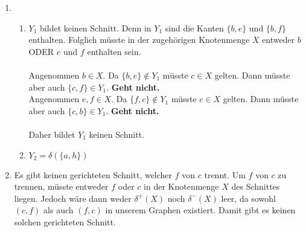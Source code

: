 \documentclass[12pt, a4paper]{article}
\begin{document}
\begin{enumerate}[label=\alph*)]
	\item
		\begin{enumerate}[label=(\roman*)]
			\item $Y_1$ bildet keinen Schnitt. Denn in $Y_1$ sind die Kanten $\{b,e\}$ und $\{b,f\}$ enthalten. Folglich müsste in der zugehörigen Knotenmenge $X$ entweder $b$ ODER $e$ und $f$ enthalten sein.\\
				\\Angenommen $b \in X$. Da $\{b,e\} \not\in Y_1$ müsste $c \in X$ gelten. Dann müsste aber auch $\{c,f\} \in Y_1$. \textbf{Geht nicht.}\\
				Angenommen $e,f \in X$. Da $\{f,c\} \not\in Y_1$ müsste $c \in X$ gelten. Dann müsste aber auch $\{c,b\} \in Y_1$. \textbf{Geht nicht.}\\
				\\Daher bildet $Y_1$ keinen Schnitt.
			
			\item $Y_2 = \delta(\{a,h\})$
		\end{enumerate}
	
	\item Es gibt keinen gerichteten Schnitt, welcher $f$ von $c$ trennt. Um $f$ von $c$ zu trennen, müsste entweder $f$ oder $c$ in der Knotenmenge $X$ des Schnittes liegen. Jedoch wäre dann weder $\delta^+(X)$ noch $\delta^-(X)$ leer, da sowohl $(c,f)$ als auch $(f,c)$ in unserem Graphen existiert. Damit gibt es keinen solchen gerichteten Schnitt.
\end{enumerate}



\newpage
\end{document}
